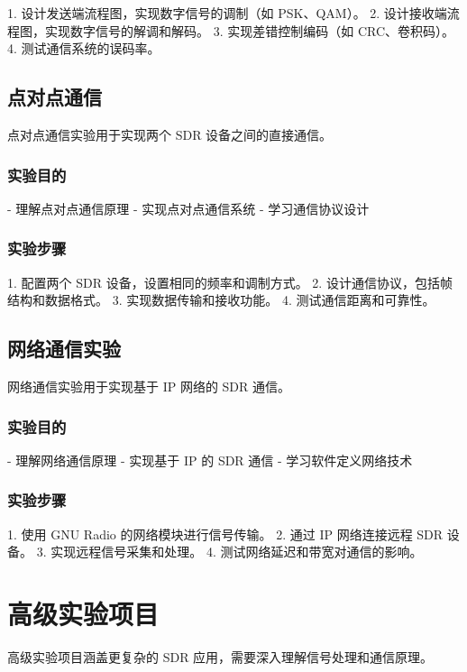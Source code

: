 \documentclass[UTF8]{ctexbook}
\begin{document}
1. 设计发送端流程图，实现数字信号的调制（如 PSK、QAM）。
2. 设计接收端流程图，实现数字信号的解调和解码。
3. 实现差错控制编码（如 CRC、卷积码）。
4. 测试通信系统的误码率。

\subsection{点对点通信}

点对点通信实验用于实现两个 SDR 设备之间的直接通信。

\subsubsection{实验目的}

- 理解点对点通信原理
- 实现点对点通信系统
- 学习通信协议设计

\subsubsection{实验步骤}

1. 配置两个 SDR 设备，设置相同的频率和调制方式。
2. 设计通信协议，包括帧结构和数据格式。
3. 实现数据传输和接收功能。
4. 测试通信距离和可靠性。

\subsection{网络通信实验}

网络通信实验用于实现基于 IP 网络的 SDR 通信。

\subsubsection{实验目的}

- 理解网络通信原理
- 实现基于 IP 的 SDR 通信
- 学习软件定义网络技术

\subsubsection{实验步骤}

1. 使用 GNU Radio 的网络模块进行信号传输。
2. 通过 IP 网络连接远程 SDR 设备。
3. 实现远程信号采集和处理。
4. 测试网络延迟和带宽对通信的影响。

\section{高级实验项目}

高级实验项目涵盖更复杂的 SDR 应用，需要深入理解信号处理和通信原理。
\end{document}
